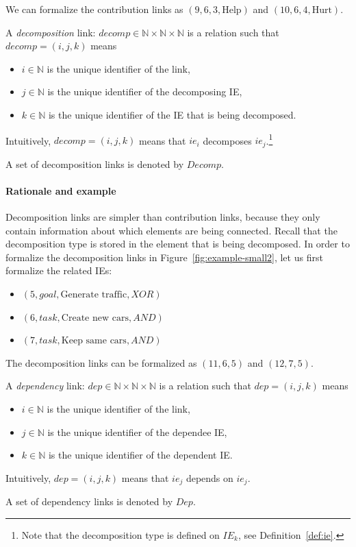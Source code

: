 We can formalize the contribution links as $(9, 6, 3, \text{Help})$ and $(10, 6, 4, \text{Hurt})$.

\begin{definition}
\label{def:link:decomp}
A \emph{decomposition} link: $decomp\in \mathbb{N}\times\mathbb{N}\times\mathbb{N}$ is a relation such that $decomp = (i,j,k)$ means
\begin{itemize}
\item $i\in \mathbb{N}$ is the unique identifier of the link,
\item $j\in \mathbb{N}$ is the unique identifier of the decomposing IE,
\item $k\in \mathbb{N}$ is the unique identifier of the IE that is being decomposed.
\end{itemize}
Intuitively, $decomp = (i,j,k)$ means that $ie_i$ decomposes $ie_j$.\footnote{Note that the decomposition type is defined on $IE_{k}$, see Definition~\ref{def:ie}.}

A set of decomposition links is denoted by $Decomp$.
\end{definition}

\paragraph{Rationale and example} Decomposition links are simpler than contribution links, because they only contain information about which elements are being connected. Recall that the decomposition type is stored in the element that is being decomposed. In order to formalize the decomposition links in Figure~\ref{fig:example-small2}, let us first formalize the related IEs:
\begin{itemize}
\item $(5, goal, \text{Generate traffic}, XOR)$
\item $(6, task, \text{Create new cars}, AND)$
\item $(7, task, \text{Keep same cars}, AND)$
\end{itemize}
The decomposition links can be formalized as $(11, 6, 5)$ and $(12, 7, 5)$.

\begin{definition}
\label{def:link:dependency}
A \emph{dependency} link: $dep\in \mathbb{N}\times\mathbb{N}\times\mathbb{N}$ is a relation such that $dep = (i,j,k)$ means
\begin{itemize}
\item $i\in \mathbb{N}$ is the unique identifier of the link,
\item $j\in \mathbb{N}$ is the unique identifier of the dependee IE,
\item $k\in \mathbb{N}$ is the unique identifier of the dependent IE.
\end{itemize}
Intuitively, $dep = (i,j,k)$ means that $ie_j$ depends on $ie_j$.

A set of dependency links is denoted by $Dep$.
\end{definition}

